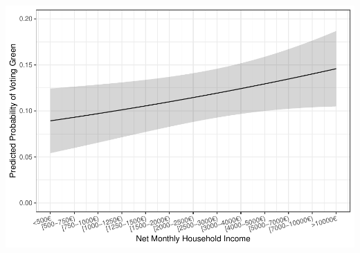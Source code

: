\documentclass[
]{article}
\begin{document}
\includegraphics{AVCD_Final_Assignment-Edenhofer_files/figure-latex/gruene-income-1.pdf}
\end{document}
